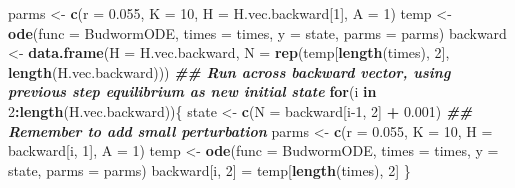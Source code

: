 \documentclass[
]{book}
\newenvironment{Shaded}{\begin{snugshade}}{\end{snugshade}}
\newcommand{\AttributeTok}[1]{\textcolor[rgb]{0.13,0.29,0.53}{#1}}
\newcommand{\ControlFlowTok}[1]{\textcolor[rgb]{0.13,0.29,0.53}{\textbf{#1}}}
\newcommand{\DecValTok}[1]{\textcolor[rgb]{0.00,0.00,0.81}{#1}}
\newcommand{\DocumentationTok}[1]{\textcolor[rgb]{0.56,0.35,0.01}{\textbf{\textit{#1}}}}
\newcommand{\FloatTok}[1]{\textcolor[rgb]{0.00,0.00,0.81}{#1}}
\newcommand{\FunctionTok}[1]{\textcolor[rgb]{0.13,0.29,0.53}{\textbf{#1}}}
\newcommand{\NormalTok}[1]{#1}
\newcommand{\OtherTok}[1]{\textcolor[rgb]{0.56,0.35,0.01}{#1}}
\newcommand{\SpecialCharTok}[1]{\textcolor[rgb]{0.81,0.36,0.00}{\textbf{#1}}}
\begin{document}
\begin{Shaded}
\begin{Highlighting}[]
\NormalTok{parms }\OtherTok{\textless{}{-}} \FunctionTok{c}\NormalTok{(}\AttributeTok{r =} \FloatTok{0.055}\NormalTok{, }\AttributeTok{K =} \DecValTok{10}\NormalTok{, }\AttributeTok{H =}\NormalTok{ H.vec.backward[}\DecValTok{1}\NormalTok{], }\AttributeTok{A =} \DecValTok{1}\NormalTok{)}
\NormalTok{temp }\OtherTok{\textless{}{-}} \FunctionTok{ode}\NormalTok{(}\AttributeTok{func =}\NormalTok{ BudwormODE, }\AttributeTok{times =}\NormalTok{ times, }\AttributeTok{y =}\NormalTok{ state, }\AttributeTok{parms =}\NormalTok{ parms)}
\NormalTok{backward }\OtherTok{\textless{}{-}} \FunctionTok{data.frame}\NormalTok{(}\AttributeTok{H =}\NormalTok{ H.vec.backward,}
                       \AttributeTok{N =} \FunctionTok{rep}\NormalTok{(temp[}\FunctionTok{length}\NormalTok{(times), }\DecValTok{2}\NormalTok{], }\FunctionTok{length}\NormalTok{(H.vec.backward)))}
\DocumentationTok{\#\# Run across backward vector, using previous step equilibrium as new initial state}
\ControlFlowTok{for}\NormalTok{(i }\ControlFlowTok{in} \DecValTok{2}\SpecialCharTok{:}\FunctionTok{length}\NormalTok{(H.vec.backward))\{}
\NormalTok{  state }\OtherTok{\textless{}{-}} \FunctionTok{c}\NormalTok{(}\AttributeTok{N =}\NormalTok{ backward[i}\DecValTok{{-}1}\NormalTok{, }\DecValTok{2}\NormalTok{] }\SpecialCharTok{+} \FloatTok{0.001}\NormalTok{)  }\DocumentationTok{\#\# Remember to add small perturbation}
\NormalTok{  parms }\OtherTok{\textless{}{-}} \FunctionTok{c}\NormalTok{(}\AttributeTok{r =} \FloatTok{0.055}\NormalTok{, }\AttributeTok{K =} \DecValTok{10}\NormalTok{, }\AttributeTok{H =}\NormalTok{ backward[i, }\DecValTok{1}\NormalTok{], }\AttributeTok{A =} \DecValTok{1}\NormalTok{)}
\NormalTok{  temp }\OtherTok{\textless{}{-}} \FunctionTok{ode}\NormalTok{(}\AttributeTok{func =}\NormalTok{ BudwormODE, }\AttributeTok{times =}\NormalTok{ times, }\AttributeTok{y =}\NormalTok{ state, }\AttributeTok{parms =}\NormalTok{ parms)}
\NormalTok{  backward[i, }\DecValTok{2}\NormalTok{] }\OtherTok{=}\NormalTok{ temp[}\FunctionTok{length}\NormalTok{(times), }\DecValTok{2}\NormalTok{]}
\NormalTok{\}}


\end{Highlighting}
\end{Shaded}
\end{document}
